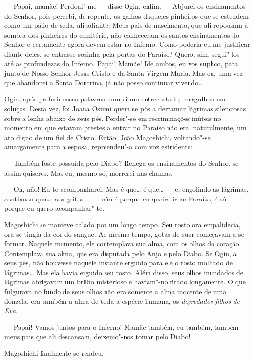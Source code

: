 --- Papai, mamãe! Perdoai"-me --- disse Ogin, enfim. --- Abjurei os
ensinamentos do Senhor, pois percebi, de repente, os galhos daqueles
pinheiros que se estendem como um pálio de seda, ali adiante. Meus pais
de nascimento, que ali repousam à sombra dos pinheiros do cemitério,
não conheceram os santos ensinamentos do Senhor e certamente agora
devem estar no Inferno. Como poderia eu me justificar diante deles, se
entrasse sozinha pela portas do Paraíso? Quero, sim, segui"-los até as
profundezas do Inferno. Papai! Mamãe! Ide ambos, eu vos suplico, para
junto de Nosso Senhor Jesus Cristo e da Santa Virgem Maria. Mas eu, uma
vez que abandonei a Santa Doutrina, já não posso continuar vivendo\ldots{}

Ogin, após proferir essas palavras num ritmo entrecortado, mergulhou em
soluços. Desta vez, foi Joana Osumi quem se pôs a derramar lágrimas
silenciosas sobre a lenha abaixo de seus pés. Perder"-se em
recriminações inúteis no momento em que estavam prestes a entrar no
Paraíso não era, naturalmente, um ato digno de um fiel de Cristo.
Então, João Magoshichi, voltando"-se amargamente para a esposa,
repreendeu"-a com voz estridente:

--- Também foste possuída pelo Diabo? Renega os ensinamentos do Senhor, se
assim quiseres. Mas eu, mesmo só, morrerei nas chamas.

--- Oh, não! Eu te acompanharei. Mas é que\ldots{} é que\ldots{} --- e, engolindo as
lágrimas, continuou quase aos gritos --- \ldots{} não é porque eu queira ir ao
Paraíso, é só\ldots{} porque eu quero acompanhar"-te.

Magoshichi se manteve calado por um longo tempo. Seu rosto ora
empalidecia, ora se tingia da cor do sangue. Ao mesmo tempo, gotas de
suor começavam a se formar. Naquele momento, ele contemplava sua alma,
com os olhos do coração. Contemplava sua alma, que era disputada pelo
Anjo e pelo Diabo. Se Ogin, a seus pés, não houvesse naquele instante
erguido para ele o rosto molhado de lágrimas\ldots{} Mas ela havia erguido
seu rosto. Além disso, seus olhos inundados de lágrimas abrigavam um
brilho misterioso e haviam"-no fitado longamente. O que fulgurava no
fundo de seus olhos não era somente a alma inocente de uma donzela, era
também a alma de toda a espécie humana, os \textit{degredados filhos de Eva}.

--- Papai! Vamos juntos para o Inferno! Mamãe também, eu também, também 
meus pais que ali descansam, deixemo"-nos tomar pelo Diabo!

Magoshichi finalmente se rendeu.

